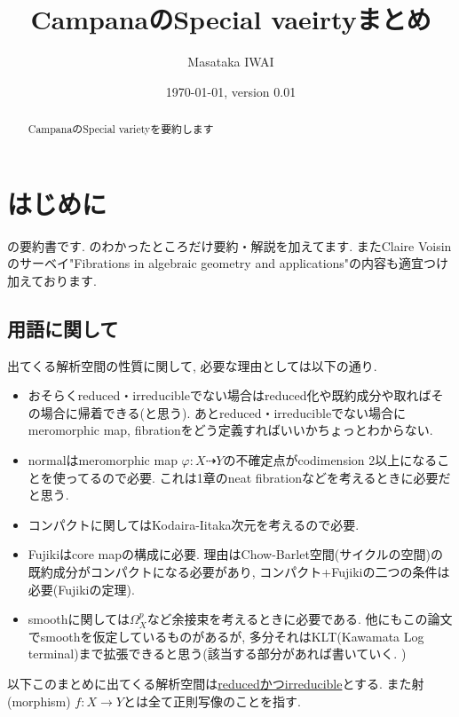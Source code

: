 \documentclass[dvipdfmx,a4paper,11pt]{article} %
\title{CampanaのSpecial vaeirtyまとめ}
\author{Masataka IWAI}
\date{\today, version 0.01}
\theoremstyle{definition}
\theoremstyle{remark}
\numberwithin{equation}{section}
\begin{document}
\maketitle
%
\begin{abstract}
CampanaのSpecial varietyを要約します
\end{abstract}
%
\setcounter{tocdepth}{3}
\tableofcontents

\section*{はじめに}
\cite{Cam04}の要約書です. 
\cite{Cam04}のわかったところだけ要約・解説を加えてます. 
またClaire Voisinのサーベイ\cite{Voi}"Fibrations in algebraic geometry and applications"の内容も適宜つけ加えております.


\subsection{用語に関して}

出てくる解析空間の性質に関して, 必要な理由としては以下の通り. 
\begin{itemize}
\item おそらくreduced・irreducibleでない場合はreduced化や既約成分や取ればその場合に帰着できる(と思う).
あとreduced・irreducibleでない場合にmeromorphic map, fibrationをどう定義すればいいかちょっとわからない. 
\item normalはmeromorphic map $\varphi : X \dashrightarrow Y$の不確定点がcodimension 2以上になることを使ってるので必要. これは1章のneat fibrationなどを考えるときに必要だと思う. 
\item コンパクトに関してはKodaira-Iitaka次元を考えるので必要. 
\item Fujikiはcore mapの構成に必要. 理由はChow-Barlet空間(サイクルの空間)の既約成分がコンパクトになる必要があり, コンパクト+Fujikiの二つの条件は必要(Fujikiの定理). 
\item smoothに関しては$\Omega_{X}^{p}$など余接束を考えるときに必要である. 他にもこの論文でsmoothを仮定しているものがあるが, 多分それはKLT(Kawamata Log terminal)まで拡張できると思う(該当する部分があれば書いていく. )
\end{itemize}

以下このまとめに出てくる解析空間は\underline{reducedかつirreducible}とする. 
また射(morphism) $f : X \to Y$とは全て正則写像のことを指す. 
\end{document}

